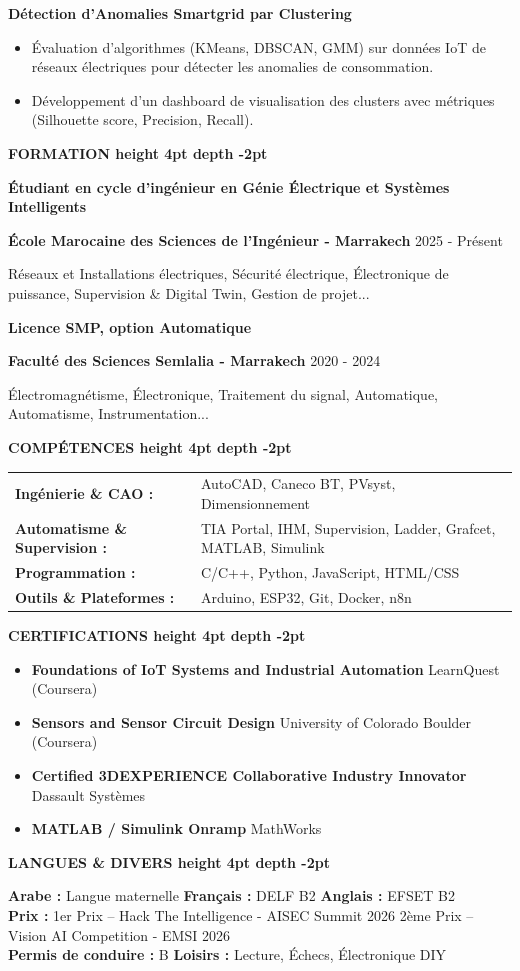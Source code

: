 \documentclass[10pt,a4paper]{../../altacv}
\renewcommand{\cvsection}[2][]{%
  \medskip%
  {\color{heading}\LARGE\bfseries #2 \hspace{0.2em}\leaders\vrule height 4pt depth -2pt\hfill\mbox{}}\par\smallskip
}
\renewcommand{\cvevent}[4]{%
  {\large\bfseries\color{accent}#1\par}
  \smallskip\normalsize
  \ifstrequal{#2}{}{}{%
    \textbf{\color{emphasis}#2\ifstrequal{#4}{}{}{ - #4}}%
  }%
  \hfill
  \ifstrequal{#3}{}{}{{\small#3}}%
  \par\smallskip
}
\begin{document}
{\large\bfseries\color{accent} Détection d'Anomalies Smartgrid par Clustering}\\[0.05cm]
\begin{itemize}
  \item Évaluation d'algorithmes (KMeans, DBSCAN, GMM) sur données IoT de réseaux électriques pour détecter les anomalies de consommation.
  \item Développement d'un dashboard de visualisation des clusters avec métriques (Silhouette score, Precision, Recall).
\end{itemize}

\cvsection{FORMATION}
\cvevent{Étudiant en cycle d'ingénieur en Génie Électrique et Systèmes Intelligents}{École Marocaine des Sciences de l'Ingénieur}{2025 - Présent}{Marrakech}
\small Réseaux et Installations électriques, Sécurité électrique, Électronique de puissance, Supervision \& Digital Twin, Gestion de projet...

\cvevent{Licence SMP, option Automatique}{Faculté des Sciences Semlalia}{2020 - 2024}{Marrakech}
\small Électromagnétisme, Électronique, Traitement du signal, Automatique, Automatisme, Instrumentation...

\cvsection{COMPÉTENCES}
\begin{tabular}{@{}ll@{}}
\textbf{Ingénierie \& CAO :} & AutoCAD, Caneco BT, PVsyst, Dimensionnement \\[1pt]
\textbf{Automatisme \& Supervision :} & TIA Portal, IHM, Supervision, Ladder, Grafcet, MATLAB, Simulink \\[1pt]
\textbf{Programmation :} & C/C++, Python, JavaScript, HTML/CSS \\[1pt]
\textbf{Outils \& Plateformes :} & Arduino, ESP32, Git, Docker, n8n \\
\end{tabular}

\cvsection{CERTIFICATIONS}
\begin{itemize}[leftmargin=*, label=\textbullet, itemsep=2pt]
  \item \textbf{Foundations of IoT Systems and Industrial Automation} \hfill {\color{emphasis}LearnQuest (Coursera)}
  \item \textbf{Sensors and Sensor Circuit Design} \hfill {\color{emphasis}University of Colorado Boulder (Coursera)}
  \item \textbf{Certified 3DEXPERIENCE Collaborative Industry Innovator} \hfill {\color{emphasis}Dassault Systèmes}
  \item \textbf{MATLAB / Simulink Onramp} \hfill {\color{emphasis}MathWorks}
\end{itemize}

\cvsection{LANGUES \& DIVERS}
\textbf{Arabe :} Langue maternelle \hfill \textbf{Français :} DELF B2 \hfill \textbf{Anglais :} EFSET B2\\[2pt]
\textbf{Prix :} 1er Prix -- Hack The Intelligence - AISEC Summit 2026 \hfill 2ème Prix -- Vision AI Competition - EMSI 2026\\[2pt]
\textbf{Permis de conduire :} B \hfill \textbf{Loisirs :} Lecture, Échecs, Électronique DIY
\end{document}
